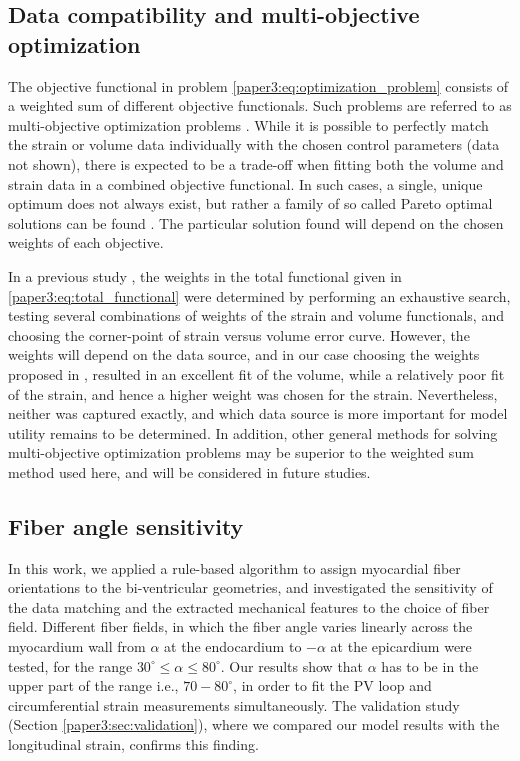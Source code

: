 \subsection{Data compatibility and multi-objective optimization}

The objective functional in  problem \eqref{paper3:eq:optimization_problem}
consists of a weighted sum of different objective functionals.
Such problems are referred to as multi-objective optimization problems
\citep{marler2004survey}.  While it is possible to perfectly match the
strain or volume data individually with the chosen control parameters (data not shown), there is
expected to be a trade-off when fitting both the volume and strain data
 in a combined objective functional. In such
cases, a single, unique optimum does not always exist, but rather
a family of so called Pareto optimal solutions can be found \citep{marler2004survey}.
The particular solution found will depend on the chosen weights of
each objective.

In a previous study \citep{balaban}, the weights in the total
functional given in \eqref{paper3:eq:total_functional} were determined by performing an
exhaustive search, testing several combinations of weights of the strain and volume
functionals, and choosing the corner-point of strain versus volume
error curve. However, the weights will depend on the data 
source, and in our case choosing the weights proposed in \citep{balaban},
resulted in an excellent fit of the volume, while a relatively
poor fit of the strain, and hence a higher weight was chosen for the
strain. Nevertheless, neither was captured exactly, and which data
source is more important for model utility remains to be
determined. In addition, other general methods for solving
multi-objective optimization problems \citep{marler2004survey} may be
superior to the weighted sum method used here, and will be considered
in future studies. 

\subsection{Fiber angle sensitivity}
In this work, we applied a rule-based algorithm \citep{bayer2012novel} to
assign myocardial fiber orientations to the bi-ventricular geometries,
and investigated the sensitivity of the data matching and the extracted
mechanical features to the choice of fiber field.
Different fiber fields, in which the fiber angle varies linearly
across the myocardium wall from $\alpha$ at the endocardium to
$-\alpha$ at the epicardium were tested, for the range $30^\circ \leq \alpha \leq
80^\circ$. Our results show that $\alpha$ has to be in the upper part
of the range i.e., $70-80^{\circ}$, in order to fit the PV loop and
circumferential strain measurements simultaneously.
The validation study (Section \ref{paper3:sec:validation}), where we compared
our model results with the longitudinal strain, confirms this finding. 

